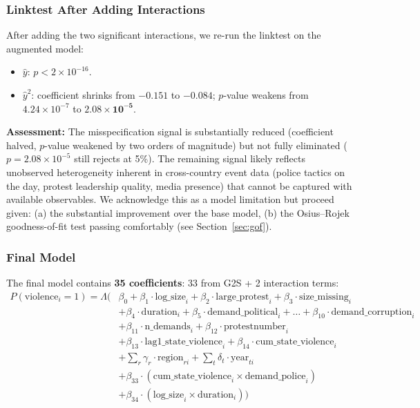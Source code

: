 \documentclass[12pt,a4paper]{article}
\begin{document}
\subsubsection{Linktest After Adding Interactions}

After adding the two significant interactions, we re-run the linktest on the augmented model:
\begin{itemize}
  \item $\hat{y}$: $p < 2 \times 10^{-16}$. \checkmark
  \item $\hat{y}^2$: coefficient shrinks from $-0.151$ to $\mathbf{-0.084}$; $p$-value weakens from $4.24 \times 10^{-7}$ to $\mathbf{2.08 \times 10^{-5}}$.
\end{itemize}

\textbf{Assessment:} The misspecification signal is substantially reduced (coefficient halved, $p$-value weakened by two orders of magnitude) but not fully eliminated ($p = 2.08 \times 10^{-5}$ still rejects at 5\%). The remaining signal likely reflects unobserved heterogeneity inherent in cross-country event data (police tactics on the day, protest leadership quality, media presence) that cannot be captured with available observables. We acknowledge this as a model limitation but proceed given: (a) the substantial improvement over the base model, (b) the Osius--Rojek goodness-of-fit test passing comfortably (see Section~\ref{sec:gof}).

\subsubsection{Final Model}

The final model contains \textbf{35 coefficients}: 33 from G2S + 2 interaction terms:
\begin{equation}
\begin{split}
P(\text{violence}_i = 1) = \Lambda\Big( & \beta_0 + \beta_1 \cdot \text{log\_size}_i + \beta_2 \cdot \text{large\_protest}_i + \beta_3 \cdot \text{size\_missing}_i \\
& + \beta_4 \cdot \text{duration}_i + \beta_5 \cdot \text{demand\_political}_i + \ldots + \beta_{10} \cdot \text{demand\_corruption}_i \\
& + \beta_{11} \cdot \text{n\_demands}_i + \beta_{12} \cdot \text{protestnumber}_i \\
& + \beta_{13} \cdot \text{lag1\_state\_violence}_i + \beta_{14} \cdot \text{cum\_state\_violence}_i \\
& + \sum_r \gamma_r \cdot \text{region}_{ri} + \sum_t \delta_t \cdot \text{year}_{ti} \\
& + \beta_{33} \cdot (\text{cum\_state\_violence}_i \times \text{demand\_police}_i) \\
& + \beta_{34} \cdot (\text{log\_size}_i \times \text{duration}_i) \Big)
\end{split}
\end{equation}
\end{document}
